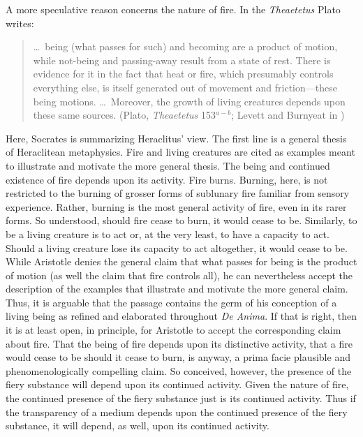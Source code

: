 A more speculative reason concerns the nature of fire. In the \emph{Theaetetus} Plato writes:
\begin{quote}
	\ldots\ being (what passes for such) and becoming are a product of motion, while not-being and passing-away result from a state of rest. There is evidence for it in the fact that heat or fire, which presumably controls everything else, is itself generated out of movement and friction---these being motions. \ldots\ Moreover, the growth of living creatures depends upon these same sources. (Plato, \emph{Theaetetus} 153\( ^{a-b} \); Levett and Burnyeat in \citealt[70]{Cooper:1997fk})
\end{quote}
Here, Socrates is summarizing Heraclitus' view. The first line is a general thesis of Heraclitean metaphysics. Fire and living creatures are cited as examples meant to illustrate and motivate the more general thesis. The being and continued existence of fire depends upon its activity. Fire burns. Burning, here, is not restricted to the burning of grosser forms of sublunary fire familiar from sensory experience. Rather, burning is the most general activity of fire, even in its rarer forms. So understood, should fire cease to burn, it would cease to be. Similarly, to be a living creature is to act or, at the very least, to have a capacity to act. Should a living creature lose its capacity to act altogether, it would cease to be. While Aristotle denies the general claim that what passes for being is the product of motion (as well the claim that fire controls all), he can nevertheless accept the description of the examples that illustrate and motivate the more general claim. Thus, it is arguable that the passage contains the germ of his conception of a living being as refined and elaborated throughout \emph{De Anima}. If that is right, then it is at least open, in principle, for Aristotle to accept the corresponding claim about fire. That the being of fire depends upon its distinctive activity, that a fire would cease to be should it cease to burn, is anyway, a prima facie plausible and phenomenologically compelling claim. So conceived, however, the presence of the fiery substance will depend upon its continued activity. Given the nature of fire, the continued presence of the fiery substance just is its continued activity. Thus if the transparency of a medium depends upon the continued presence of the fiery substance, it will depend, as well, upon its continued activity. 


